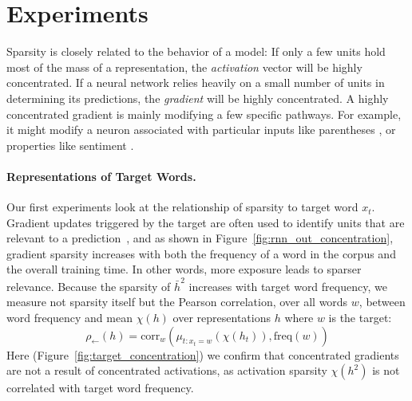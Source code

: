 \section{Experiments}%

Sparsity is closely related to the behavior of a model: If only a few units hold most of the mass of a representation, the \textit{activation} vector will be highly concentrated. If a neural network relies heavily on a small number of units in determining its predictions, the \textit{gradient} will be highly concentrated. A highly concentrated gradient is mainly modifying a few specific pathways. For example, it might modify a neuron associated with particular inputs like parentheses \cite{karpathy_visualizing_2015}, or properties like sentiment \cite{radford_learning_2017}.

\paragraph{Representations of Target Words.}
Our first experiments look at the relationship of sparsity to target word $x_t$. Gradient updates triggered by the target are often used to identify units that are relevant to a prediction~\cite{li_visualizing_2015}, and as shown in Figure~\ref{fig:rnn_out_concentration}, gradient sparsity increases with both the frequency of a word in the corpus and the overall training time. In other words, more exposure leads to sparser relevance. Because the sparsity of $\bar{h}^2$ increases with target word frequency,   we measure not sparsity itself but the Pearson correlation, over all words $w$, between word frequency and mean $\chi(h)$ over representations $h$ where $w$ is the target:
$$
\rho_{\leftarrow}(h) = \textrm{corr}_w(\mu_{t: x_t = w}(\chi(h_t)), \textrm{freq}(w))
$$ 
Here (Figure~\ref{fig:target_concentration}) we confirm that concentrated gradients are not a result  of concentrated activations, as activation sparsity $\chi(h^2)$ is not correlated with target word frequency.

